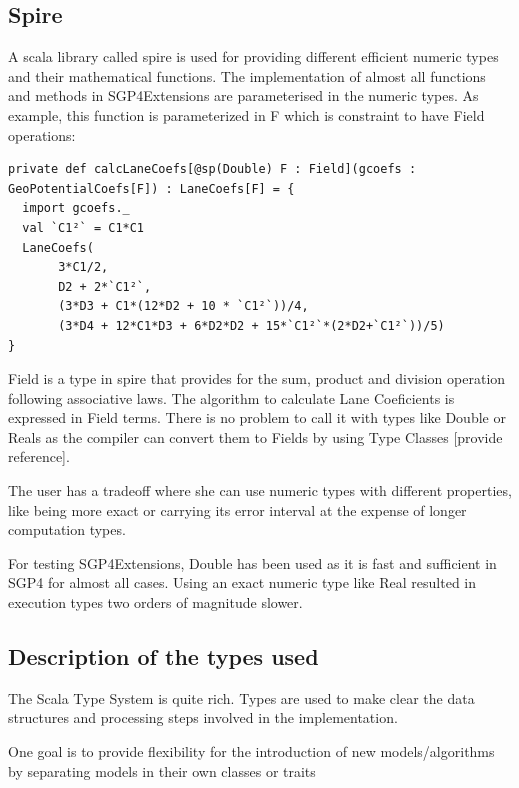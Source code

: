 \documentclass{article}
\begin{document}
\subsection{Spire}
\label{sec:spire}

A scala library called spire is used for providing different efficient numeric types
and their mathematical functions.
The implementation of almost all functions and methods in SGP4Extensions
are parameterised in the numeric types. As example, this function is parameterized
in F which is constraint to have Field operations:

\begin{lstlisting}[style=myScalastyle]
private def calcLaneCoefs[@sp(Double) F : Field](gcoefs : GeoPotentialCoefs[F]) : LaneCoefs[F] = {
  import gcoefs._
  val `C1²` = C1*C1
  LaneCoefs(
       3*C1/2,
       D2 + 2*`C1²`,
       (3*D3 + C1*(12*D2 + 10 * `C1²`))/4,
       (3*D4 + 12*C1*D3 + 6*D2*D2 + 15*`C1²`*(2*D2+`C1²`))/5)
}
\end{lstlisting}

Field is a type in spire that provides for the sum, product and division operation
following associative laws. The algorithm to calculate Lane Coeficients is expressed in Field terms.
There is no problem to call it with types like Double or Reals as the compiler can
convert them to Fields by using Type Classes [provide reference].

The user has a tradeoff where she can use numeric types with different properties,
like being more exact or carrying its error interval
at the expense of longer computation types.

For testing SGP4Extensions, Double has been used as it is fast and sufficient in SGP4 for almost all cases.
Using an exact numeric type like Real resulted in execution types two orders of magnitude slower.


\subsection{Description of the types used}
\label{sec:typesystem}

The Scala Type System is quite rich. Types are used to make clear the data structures and processing
steps involved in the implementation.

One goal is to provide flexibility for the introduction of new models/algorithms
by separating models in their own classes or traits
\end{document}

